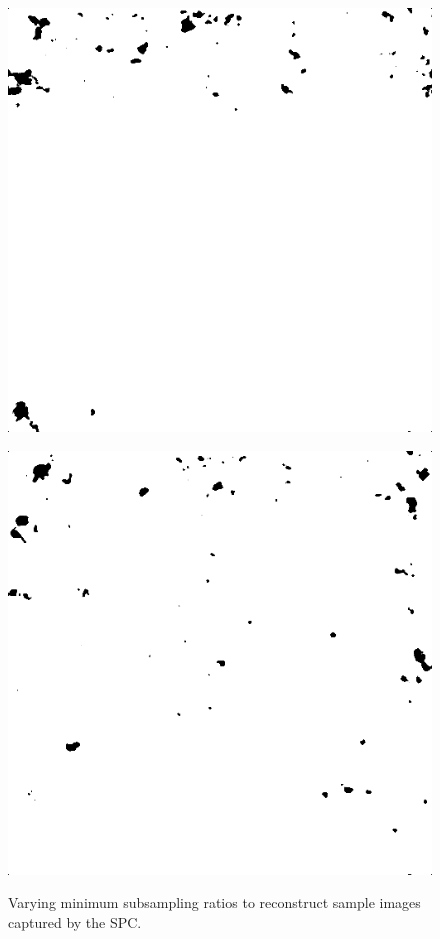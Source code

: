 \begin{figure}[H]
\begin{minipage}[t]{0.32\linewidth}
	\includegraphics[width = 1\linewidth]{result/minimum/37_512_m3.PNG}
	\label{fig:minimum_house}
\end{minipage}
\begin{minipage}[t]{0.32\linewidth} %
	\includegraphics[width = 1\linewidth]{result/minimum/64_512_m3.PNG}
	\label{fig:minimum_forest}
\end{minipage}
	\caption{Varying minimum subsampling ratios to reconstruct sample images captured by the SPC.}
	\label{fig:minimum_fig}
\end{figure}

